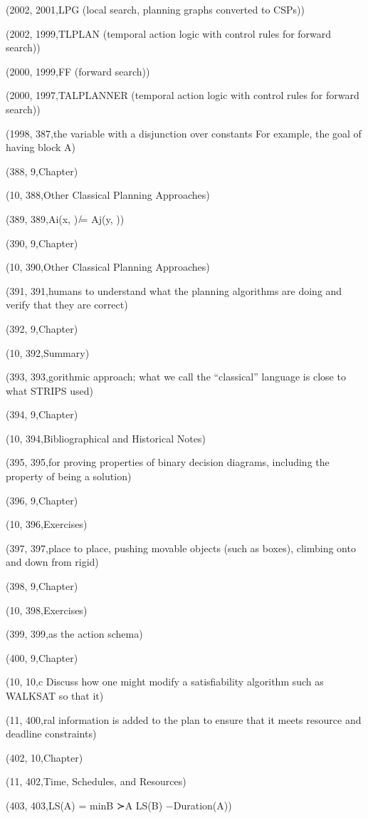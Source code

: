 (2002, 2001,LPG (local search, planning graphs converted to CSPs))

(2002, 1999,TLPLAN (temporal action logic with control rules for forward search))

(2000, 1999,FF (forward search))

(2000, 1997,TALPLANNER (temporal action logic with control rules for forward search))

(1998, 387,the variable with a disjunction over constants For example, the goal of having block A)

(388, 9,Chapter)

(10, 388,Other Classical Planning Approaches)

(389, 389,Ai(x,   ) ̸= Aj(y,   ))

(390, 9,Chapter)

(10, 390,Other Classical Planning Approaches)

(391, 391,humans to understand what the planning algorithms are doing and verify that they are correct)

(392, 9,Chapter)

(10, 392,Summary)

(393, 393,gorithmic approach; what we call the “classical” language is close to what STRIPS used)

(394, 9,Chapter)

(10, 394,Bibliographical and Historical Notes)

(395, 395,for proving properties of binary decision diagrams, including the property of being a solution)

(396, 9,Chapter)

(10, 396,Exercises)

(397, 397,place to place, pushing movable objects (such as boxes), climbing onto and down from rigid)

(398, 9,Chapter)

(10, 398,Exercises)

(399, 399,as the action schema)

(400, 9,Chapter)

(10, 10,c Discuss how one might modify a satisﬁability algorithm such as WALKSAT so that it)

(11, 400,ral information is added to the plan to ensure that it meets resource and deadline constraints)

(402, 10,Chapter)

(11, 402,Time, Schedules, and Resources)

(403, 403,LS(A) = minB ≻A LS(B) −Duration(A))


